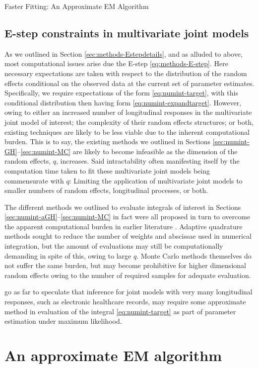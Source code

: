 \begin{chapter}{\label{cha:approx}Faster Fitting: An Approximate EM Algorithm}
\subsection{E-step constraints in multivariate joint models}\label{sec:approx-Estepmotiv}
As we outlined in Section \ref{sec:methods-Estepdetails}, and as alluded to above, most computational issues arise due the E-step \eqref{eq:methods-E-step}. Here necessary expectations are taken with respect to the distribution of the random effects conditional on the observed data at the current set of parameter estimates. Specifically, we require expectations of the form \eqref{eq:numint-target}, with this conditional distribution then having form \eqref{eq:numint-expandtarget}. However, owing to either an increased number of longitudinal responses in the multivariate joint model of interest; the complexity of their random effects structures; or both, existing techniques are likely to be less viable due to the inherent computational burden. This is to say, the existing methods we outlined in Sections \ref{sec:numint-GH}--\ref{sec:numint-MC} are likely to become infeasible as the dimension of the random effects, $q$, increases. Said intractability often manifesting itself by the computation time taken to fit these multivariate joint models being commensurate with $q$: Limiting the application of multivariate joint models to smaller numbers of random effects, longitudinal processes, or both. 

The different methods we outlined to evaluate integrals of interest in Sections \ref{sec:numint-aGH}--\ref{sec:numint-MC} in fact were all proposed in turn to overcome the apparent computational burden in earlier literature \eg \citet{Wulfsohn97}. Adaptive quadrature methods sought to reduce the number of weights and abscissae used in numerical integration, but the amount of evaluations may still be computationally demanding in spite of this, owing to large $q$. Monte Carlo methods themselves do not suffer the same burden, but may become prohibitive for higher dimensional random effects owing to the number of required samples for adequate evaluation. 

\citet{Hickey2018} go as far to speculate that inference for joint models with very many longitudinal responses, such as electronic healthcare records, may require some approximate method in evaluation of the integral \eqref{eq:numint-target} as part of parameter estimation under maximum likelihood.

\section{An approximate EM algorithm}\label{sec:approx-approx}

\end{chapter}
